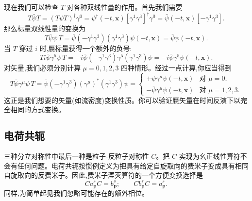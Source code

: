 现在我们可以检查 $T$ 对各种双线性量的作用。首先我们需要
\begin{equation}
  T\bar{\psi}T = (T\psi T)^{\dagger}\gamma^0
    = \psi^{\dagger}(-t,\mathbf{x})[\gamma^1\gamma^3]^{\dagger}\gamma^0
    = \bar{\psi}(-t,\mathbf{x})[-\gamma^1\gamma^3] .
  \label{eq:3.131}
\end{equation}
那么标量双线性量的变换为
\begin{equation}
  T\bar{\psi}\psi\,T = \bar{\psi}(-\gamma^1\gamma^3)(\gamma^1\gamma^3)\psi(-t,\mathbf{x})
    = \bar{\psi}\psi(-t,\mathbf{x}) .
  \label{eq:3.132}
\end{equation}
当 $T$ 穿过 $i$ 时,赝标量获得一个额外的负号:
\begin{equation}
  Ti\bar{\psi}\gamma^5\psi\,T = -i\bar{\psi}(-\gamma^1\gamma^3)\gamma^5
    (\gamma^1\gamma^3)\psi = -i\bar{\psi}\gamma^5\psi(-t,\mathbf{x}).
\end{equation}
对矢量,我们必须分别计算 $\mu = 0, 1, 2, 3$ 四种情形。经过一点计算,你应当得到
\begin{equation}
  T\bar{\psi}\gamma^\mu\psi\,T =
    \bar{\psi}(-\gamma^1\gamma^3)(\gamma^\mu)^{*}(\gamma^1\gamma^3)\psi
    = \begin{cases}
        +\bar{\psi}\gamma^\mu\psi(-t,\mathbf{x}) & \text{对 } \mu = 0;\\
        -\bar{\psi}\gamma^\mu\psi(-t,\mathbf{x}) & \text{对 } \mu = 1, 2, 3 .
      \end{cases}
  \label{eq:3.133}
\end{equation}
这正是我们想要的矢量(如流密度)变换性质。你可以验证赝矢量在时间反演下以完全相同的方式变换。

\subsection{电荷共轭}

三种分立对称性中最后一种是粒子-反粒子对称性 $C$。把 $C$ 实现为幺正线性算符不会有任何问题。电荷共轭按惯例定义为把具有给定自旋取向的费米子变成具有相同自旋取向的反费米子。因此,费米子湮灭算符的一个方便变换选择是
\begin{equation}
  C a_{\mathbf{p}}^s C = b_{\mathbf{p}}^s;\qquad
  C b_{\mathbf{p}}^s C = a_{\mathbf{p}}^s .
  \label{eq:3.134}
\end{equation}
同样,为简单起见我们忽略可能存在的额外相位。

